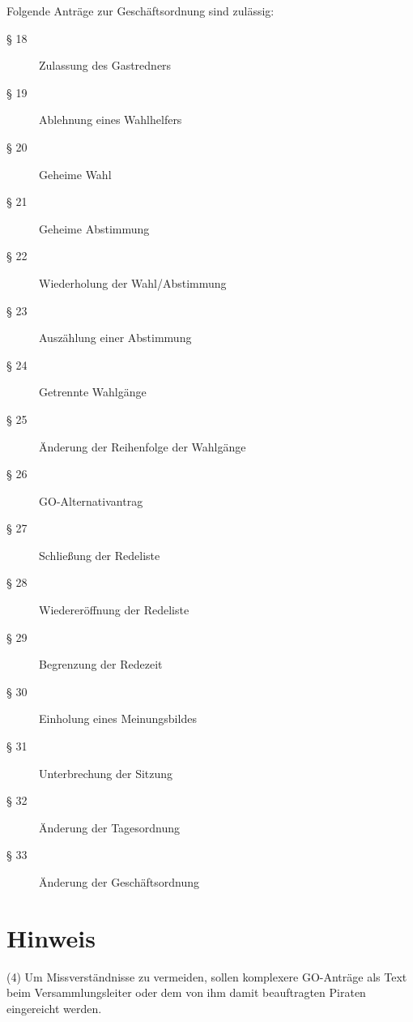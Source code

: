 Folgende Anträge zur Geschäftsordnung sind zulässig:

\begin{description}
    \item[§ 18] Zulassung des Gastredners
    \item[§ 19] Ablehnung eines Wahlhelfers
    \item[§ 20] Geheime Wahl
    \item[§ 21] Geheime Abstimmung
    \item[§ 22] Wiederholung der Wahl/Abstimmung
    \item[§ 23] Auszählung einer Abstimmung
    \item[§ 24] Getrennte Wahlgänge
    \item[§ 25] Änderung der Reihenfolge der Wahlgänge
    \item[§ 26] GO-Alternativantrag
    \item[§ 27] Schließung der Redeliste
    \item[§ 28] Wiedereröffnung der Redeliste
    \item[§ 29] Begrenzung der Redezeit
    \item[§ 30] Einholung eines Meinungsbildes
    \item[§ 31] Unterbrechung der Sitzung
    \item[§ 32] Änderung der Tagesordnung
    \item[§ 33] Änderung der Geschäftsordnung
\end{description}

\section{Hinweis}


(4) Um Missverständnisse zu vermeiden, sollen komplexere GO-Anträge als Text beim Versammlungsleiter oder dem von ihm damit beauftragten Piraten eingereicht werden.
